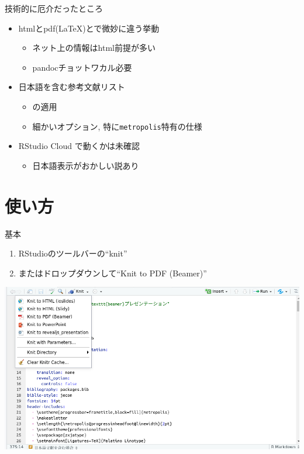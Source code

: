 \documentclass[14pt,ignorenonframetext,]{beamer}
\providecommand{\tightlist}{%
  \setlength{\itemsep}{0pt}\setlength{\parskip}{0pt}}
\begin{document}
\begin{frame}[fragile]{技術的に厄介だったところ}
\protect\hypertarget{ux6280ux8853ux7684ux306bux5384ux4ecbux3060ux3063ux305fux3068ux3053ux308d}{}

\begin{itemize}
\tightlist
\item
  htmlとpdf(\LaTeX)とで微妙に違う挙動

  \begin{itemize}
  \tightlist
  \item
    ネット上の情報はhtml前提が多い
  \item
    pandocチョットワカル必要
  \end{itemize}
\item
  日本語を含む参考文献リスト

  \begin{itemize}
  \tightlist
  \item
    \upBibTeX の適用
  \item
    細かいオプション, 特に\texttt{metropolis}特有の仕様
  \end{itemize}
\item
  RStudio Cloud で動くかは未確認

  \begin{itemize}
  \tightlist
  \item
    日本語表示がおかしい説あり
  \end{itemize}
\end{itemize}

\end{frame}

\hypertarget{ux4f7fux3044ux65b9}{%
\section{使い方}\label{ux4f7fux3044ux65b9}}

\begin{frame}{基本}
\protect\hypertarget{ux57faux672c}{}

\begin{enumerate}
\tightlist
\item
  RStudioのツールバーの``knit''
\item
  またはドロップダウンして``Knit to PDF (Beamer)''
\end{enumerate}

\begin{center}\includegraphics[width=0.9\linewidth]{img/render} \end{center}

\end{frame}
\end{document}
